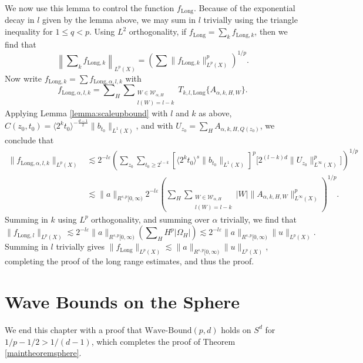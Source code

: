We now use this lemma to control the function $f_{\text{Long}}$. Because of the exponential decay in $l$ given by the lemma above, we may sum in $l$ trivially using the triangle inequality for $1 \leq q < p$. Using $L^2$ orthogonality, if $f_{\text{Long}} = \sum_k f_{\text{Long},k}$, then we find that
%
\[ \left\| \sum\nolimits_k f_{\text{Long},k} \right\|_{L^p(X)} = \left( \sum \| f_{\text{Long},k} \|_{L^p(X)}^p \right)^{1/p}. \]
%
Now write $f_{\text{Long},k} = \sum f_{\text{Long},\alpha,l,k}$ with
%
\[ f_{\text{Long},\alpha,l,k} = \sum\nolimits_H \sum\nolimits_{\substack{W \in \mathcal{W}_{\alpha,H}\\l(W) = l - k}} T_{k,l,\text{Long}} \{ A_{\alpha,k,H,W} \}. \]
%
Applying Lemma \ref{lemma:scaleupbound} with $l$ and $k$ as above, $C(z_0,t_0) = \langle 2^k t_0 \rangle^{- \frac{d-1}{2}} \| b_{t_0} \|_{L^1(X)}$, and with $U_{z_0} = \sum\nolimits_H A_{\alpha,k,H,Q(z_0)}$, we conclude that %
\begin{align*}
    \| f_{\text{Long},\alpha,l,k} \|_{L^p(X)} &\lesssim 2^{-l \varepsilon} \left( \sum\nolimits_{z_0} \sum\nolimits_{t_0 \geq 2^{l-k}} [ \langle 2^k t_0 \rangle^{s} \| b_{t_0} \|_{L^1(X)} ]^p \big[ 2^{(l-k)d} \| U_{z_0} \|_{L^\infty(X)}^p \big] \right)^{1/p}\\
    &\lesssim \| a \|_{R^{s,p}[0,\infty)} 2^{-l \varepsilon} \left(  \sum\nolimits_H \sum\nolimits_{\substack{W \in \mathcal{W}_{\alpha,H}\\l(W) = l-k}} |W| \| A_{\alpha,k,H,W} \|_{L^\infty(X)}^p \right)^{1/p}.
\end{align*}
Summing in $k$ using $L^p$ orthogonality, and summing over $\alpha$ trivially, we find that
%
\[ \| f_{\text{Long},l} \|_{L^p(X)} \lesssim 2^{-l \varepsilon}  \| a \|_{R^{s,p}[0,\infty)} \left( \sum\nolimits_H H^p |\Omega_H| \right) \lesssim 2^{-l \varepsilon}  \| a \|_{R^{s,p}[0,\infty)} \| u \|_{L^p(X)}. \]
%
Summing in $l$ trivially gives $\| f_{\text{Long}} \|_{L^p(X)} \lesssim \| a \|_{R^{s,p}[0,\infty)} \| u \|_{L^p(X)}$, completing the proof of the long range estimates, and thus the proof.

\section{Wave Bounds on the Sphere}

We end this chapter with a proof that $\text{Wave-Bound}(p,d)$ holds on $S^d$ for $1/p - 1/2 > 1/(d-1)$, which completes the proof of Theorem \ref{maintheoremsphere}.

